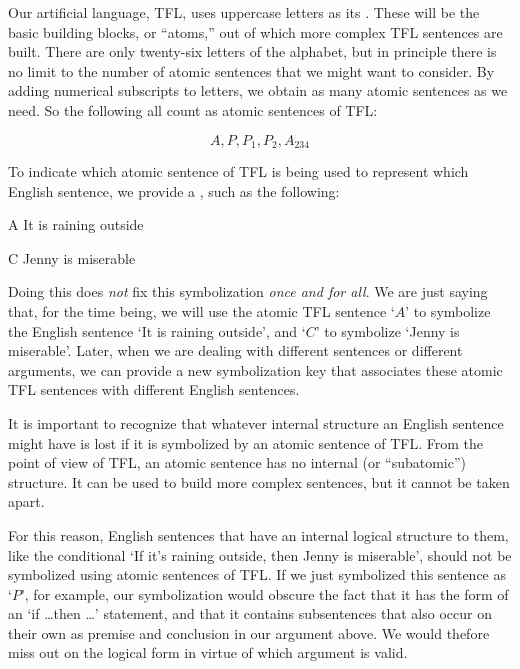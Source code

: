 Our artificial language, TFL, uses uppercase letters as its . These will be the basic building blocks, or ``atoms,'' out of which more complex TFL sentences are built.  There are only twenty-six letters of the alphabet, but in principle there is no limit to the number of atomic sentences that we might want to consider. By adding numerical subscripts to letters, we obtain as many atomic sentences as we need.  So the following all count as atomic sentences of TFL:

	$$A, P, P_1, P_2, A_{234}$$

To indicate which atomic sentence of TFL is being used to represent which English sentence, we provide a , such as the following:

	\begin{ekey}
		\item[A] It is raining outside
		\item[C] Jenny is miserable
	\end{ekey}
	
Doing this does \emph{not} fix this symbolization \emph{once and for all}. We are just saying that, for the time being, we will use the atomic TFL sentence `$A$' to symbolize the English sentence `It is raining outside', and `$C$' to symbolize `Jenny is miserable'. Later, when we are dealing with different sentences or different arguments, we can provide a new symbolization key that associates these atomic TFL sentences with different English sentences.

	
It is important to recognize that whatever internal structure an English sentence might have is lost if it is symbolized by an atomic sentence of TFL. From the point of view of TFL, an atomic sentence has no internal (or ``subatomic'') structure. It can be used to build more complex sentences, but it cannot be taken apart.

For this reason, English sentences that have an internal logical structure to them, like the conditional `If it's raining outside, then Jenny is miserable', should not be symbolized using atomic sentences of TFL.  If we just symbolized this sentence as `$P$', for example, our symbolization would obscure the fact that it has the form of an `if \ldots then \ldots' statement, and that it contains subsentences that also occur on their own as premise and conclusion in our argument  above. We would thefore miss out on the logical form in virtue of which argument  is valid.  

